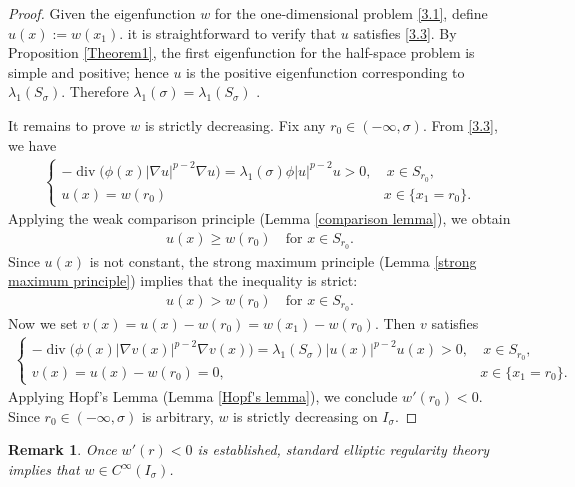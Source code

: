 \documentclass[11pt,leqno]{amsart}
\newtheorem{remark}[theorem]{Remark}
\def\l{\lambda}
\def\div{\operatorname{div}}
\numberwithin{equation}{section}
\begin{document}
\begin{proof} 
Given the eigenfunction $w$ for the one-dimensional problem \eqref{3.1}, define  $u(x):=w(x_1)$. it is  straightforward to verify that $u$ satisfies \eqref{3.3}. By  Proposition \ref{Theorem1}, the first eigenfunction for the half-space problem is simple and positive; hence  $u$ is the positive eigenfunction corresponding to $\lambda_1(S_\sigma)$. Therefore $\lambda_1(\sigma) = \lambda_1(S_\sigma)$ .

It remains to prove $w$ is strictly decreasing. Fix any $r_0\in(-\infty,\sigma)$. From \eqref{3.3}, we have 
\begin{align*}
\begin{cases}
 -\div\bigl(\phi (x)|\nabla u|^{p-2}\nabla u\bigr)=\lambda_1(\sigma)\phi |u|^{p-2}u>0, & \ x \in S_{r_0},\\[4pt]
u(x)=w(r_0) & x\in  \{x_1=r_0\}.
\end{cases}
\end{align*}
Applying the weak comparison principle (Lemma \ref{comparison lemma}), we obtain
\begin{align*}
u(x)\geq w(r_0)\quad \text{for } x\in S_{r_0}.
\end{align*}
Since $u(x)$ is not  constant, the strong maximum principle (Lemma \ref{strong maximum principle}) implies  that the inequality is strict:
\begin{align*}
   u(x)>w(r_0)\quad \text{for } x\in S_{r_0}. 
\end{align*}
Now we set $v(x)=u(x)-w(r_0)=w(x_1)-w(r_0)$. Then $v$ satisfies 
\begin{align}
\begin{cases}
-\div\bigl(\phi (x)|\nabla v(x)|^{p-2}\nabla  v(x)\bigr)=\l_1(S_{\sigma}) |u(x)|^{p-2}u(x)>0, & \ x \in S_{r_0},\\[4pt]
v(x)=u(x)-w(r_0)=0, &  x\in \{x_1=r_0\}.
\end{cases}
\end{align}
Applying  Hopf's Lemma (Lemma \ref{Hopf's lemma}), we conclude $w'(r_0)<0$. Since $r_0\in (-\infty, \sigma)$ is arbitrary, $w$ is strictly decreasing on $I_\sigma$.
\end{proof}

\begin{remark}\label{remark1}
Once  $w'(r)<0$ is established, standard elliptic regularity theory implies that $w\in C^{\infty}(I_{\sigma})$.
\end{remark}
\end{document}
